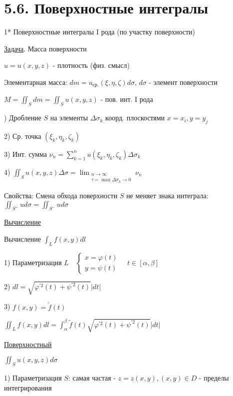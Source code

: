 \documentclass[12pt]{article}
\begin{document}
    \section{5.6. Поверхностные интегралы}

    1* Поверхностные интегралы I рода (по участку поверхности)

    \underline{Задача}. Масса поверхности

    $u = u(x, y, z)$ - плотность (физ. смысл)

    Элементарная масса: $\displaystyle dm = u_{\text{ср.}}(\xi, \eta, \zeta) d\sigma$, $d\sigma$ - элемент поверхности

    $\displaystyle M = \iint_S dm = \iint_S u(x, y, z)$ - пов. инт. I рода

    ) Дробление $S$ на элементы $\displaystyle \Delta \sigma_k$ коорд. плоскостями $\displaystyle x = x_i, y = y_j$

    2) Ср. точка $\displaystyle (\xi_k, \eta_k, \zeta_k)$

    3) Инт. сумма $\displaystyle \nu_n = \sum_{k = 1}^{n} u(\xi_k, \eta_k, \zeta_k) \Delta \sigma_k$

    4) $\displaystyle \iint_S u(x, y, z) \Delta \sigma = \lim_{\substack{n \to \infty \\ \tau = \max \Delta \sigma_k \to 0}} \nu_n$

    Свойства: Смена обхода поверхности $S$ не меняет знака интеграла: $\displaystyle \iint_{S^+} u d\sigma = \iint_{S^-} u d\sigma$

    \underline{Вычисление}

    \Mem Вычисление $\displaystyle \int_L f(x, y) dl$

    1) Параметризация $L \quad \begin{cases}x = \varphi(t) \\ y = \psi(t)\end{cases} \quad t \in [\alpha, \beta]$

    2) $\displaystyle dl = \sqrt{\varphi^{\prime 2}(t) + \psi^{\prime 2}(t)} |dt|$

    3) $f(x, y) = \tilde{f}(t)$

    $\displaystyle \iint_L f(x, y)dl = \int_\alpha^\beta \tilde{f}(t) \sqrt{\varphi^{\prime 2}(t) + \psi^{\prime 2}(t)} |dt|$

    \underline{Поверхностный}

    $\displaystyle \iint_S u(x, y, z) d\sigma$

    1) Параметризация $S$: самая частая - $z = z(x, y), (x, y) \in D$ - пределы интегрирования
\end{document}
